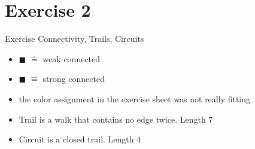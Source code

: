
\section{Exercise 2}

\setcounter{exercise}{1}

\begin{frame}[allowframebreaks]{Exercise \thesection}{Connectivity, Trails, Circuits}
    \begin{exercisenoinc}
    \end{exercisenoinc}
    \begin{solution}
        \begin{itemize}
            \item \textcolor{SecondaryColor}{$\blacksquare$} $\hat=$ weak connected
            \item \textcolor{PrimaryColor}{$\blacksquare$} $\hat=$ strong connected
            \item the color assignment in the exercise sheet was not really fitting
        \end{itemize}
    \end{solution}
    \begin{solutionnoinc}
        \begin{itemize}
            \item \alert{Trail} is a walk that contains no edge twice. Length $7$
        \end{itemize}
    \end{solutionnoinc}
    \begin{solutionnoinc}
        \begin{itemize}
            \item \alert{Circuit} is a closed trail. Length $4$
        \end{itemize}
    \end{solutionnoinc}
\end{frame}
